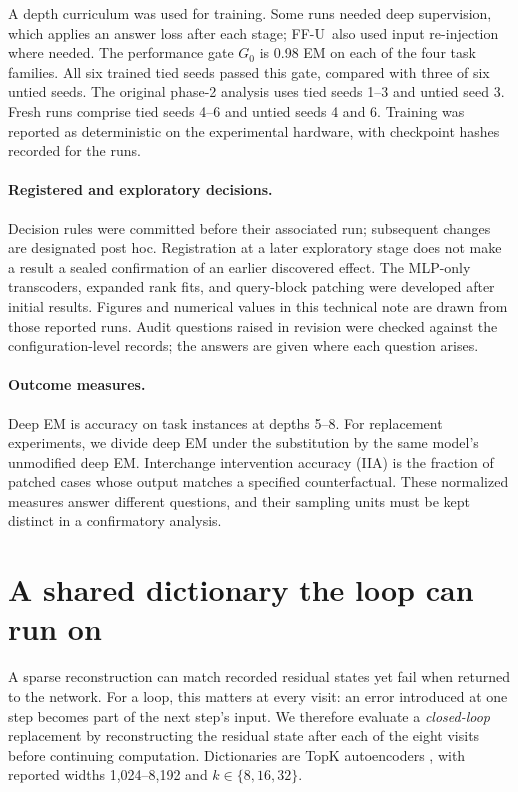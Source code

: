 \documentclass[10pt,letterpaper]{article}
\newcommand{\FFU}{\textsc{FF-U}}
\begin{document}
A depth curriculum was used for training. Some runs needed deep supervision, which applies an answer loss after each stage; \FFU\ also used input re-injection where needed. The performance gate $G_0$ is 0.98 EM on each of the four task families. All six trained tied seeds passed this gate, compared with three of six untied seeds. The original phase-2 analysis uses tied seeds 1--3 and untied seed 3. Fresh runs comprise tied seeds 4--6 and untied seeds 4 and 6. Training was reported as deterministic on the experimental hardware, with checkpoint hashes recorded for the runs.

\paragraph{Registered and exploratory decisions.} Decision rules were committed before their associated run; subsequent changes are designated post hoc. Registration at a later exploratory stage does not make a result a sealed confirmation of an earlier discovered effect. The MLP-only transcoders, expanded rank fits, and query-block patching were developed after initial results. Figures and numerical values in this technical note are drawn from those reported runs. Audit questions raised in revision were checked against the configuration-level records; the answers are given where each question arises.

\paragraph{Outcome measures.} Deep EM is accuracy on task instances at depths 5--8. For replacement experiments, we divide deep EM under the substitution by the same model's unmodified deep EM. Interchange intervention accuracy (IIA) is the fraction of patched cases whose output matches a specified counterfactual. These normalized measures answer different questions, and their sampling units must be kept distinct in a confirmatory analysis.

\section{A shared dictionary the loop can run on}\label{sec:dictionary}
A sparse reconstruction can match recorded residual states yet fail when returned to the network. For a loop, this matters at every visit: an error introduced at one step becomes part of the next step's input. We therefore evaluate a \emph{closed-loop} replacement by reconstructing the residual state after each of the eight visits before continuing computation. Dictionaries are TopK autoencoders \cite{gao}, with reported widths 1,024--8,192 and $k\in\{8,16,32\}$.
\end{document}
